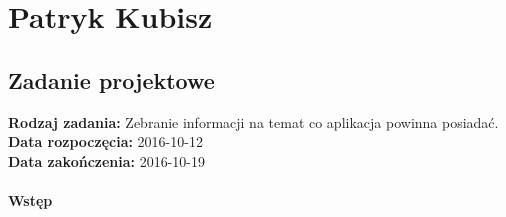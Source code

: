 \chapter {Patryk Kubisz}
\section{Zadanie projektowe}

\noindent\textbf{Rodzaj zadania:} Zebranie informacji na temat co aplikacja powinna posiadać.\\

\noindent\textbf{Data rozpoczęcia:} 2016-10-12\\

\noindent\textbf{Data zakończenia:} 2016-10-19\\\\

\noindent\textbf{Wstęp}\\

